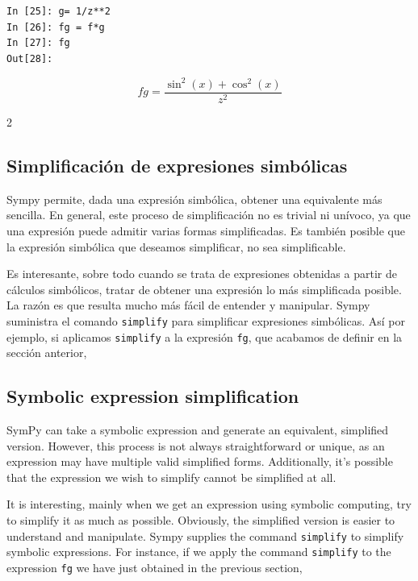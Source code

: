 \begin{center}
	\begin{minipage}{.25\textwidth}
		\begin{verbatim}
In [25]: g= 1/z**2
In [26]: fg = f*g
In [27]: fg
Out[28]:
		\end{verbatim}
	\end{minipage}
	\begin{equation*}
		fg = \frac{\sin^2(x) + \cos^2(x)}{z^2}
	\end{equation*}
\end{center}
\begin{paracol}{2}
\subsection{Simplificación de expresiones simbólicas}
Sympy permite, dada una expresión simbólica, obtener una equivalente más sencilla. En general, este proceso de simplificación no es trivial ni unívoco, ya que una expresión puede admitir varias formas simplificadas. Es también posible que la expresión simbólica que deseamos simplificar, no sea simplificable.

Es interesante, sobre todo cuando se trata de expresiones obtenidas a partir de cálculos simbólicos, tratar de obtener una expresión lo más simplificada posible. La razón es que resulta mucho más fácil de entender y manipular. Sympy suministra el comando \texttt{simplify} para simplificar expresiones simbólicas. Así por ejemplo, si aplicamos \texttt{simplify} a la expresión \texttt{fg}, que acabamos de definir en la sección anterior, 
\switchcolumn
\subsection{Symbolic expression simplification}
SymPy can take a symbolic expression and generate an equivalent, simplified version. However, this process is not always straightforward or unique, as an expression may have multiple valid simplified forms. Additionally, it's possible that the expression we wish to simplify cannot be simplified at all.

It is interesting, mainly when we get an expression using symbolic computing, try to simplify it as much as possible. Obviously, the simplified version is easier to understand and manipulate. Sympy supplies the command \texttt{simplify} to simplify symbolic expressions. For instance, if we apply the command \texttt{simplify} to the expression \texttt{fg} we have just obtained in the previous section,
\end{paracol}
